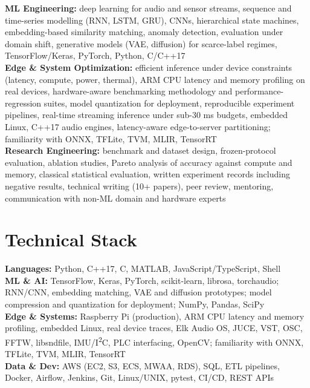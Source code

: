 \documentclass[11pt]{article}
\begin{document}
\textbf{ML Engineering:} deep learning for audio and sensor streams, sequence and time-series modelling (RNN, LSTM, GRU), CNNs, hierarchical state machines, embedding-based similarity matching, anomaly detection, evaluation under domain shift, generative models (VAE, diffusion) for scarce-label regimes, TensorFlow/Keras, PyTorch, Python, C/C++17\\
\textbf{Edge \& System Optimization:} efficient inference under device constraints (latency, compute, power, thermal), ARM CPU latency and memory profiling on real devices, hardware-aware benchmarking methodology and performance-regression suites, model quantization for deployment, reproducible experiment pipelines, real-time streaming inference under sub-30 ms budgets, embedded Linux, C++17 audio engines, latency-aware edge-to-server partitioning; familiarity with ONNX, TFLite, TVM, MLIR, TensorRT\\
\textbf{Research Engineering:} benchmark and dataset design, frozen-protocol evaluation, ablation studies, Pareto analysis of accuracy against compute and memory, classical statistical evaluation, written experiment records including negative results, technical writing (10+ papers), peer review, mentoring, communication with non-ML domain and hardware experts

\section*{Technical Stack}

\textbf{Languages:} Python, C++17, C, MATLAB, JavaScript/TypeScript, Shell\\
\textbf{ML \& AI:} TensorFlow, Keras, PyTorch, scikit-learn, librosa, torchaudio; RNN/CNN, embedding matching, VAE and diffusion prototypes; model compression and quantization for deployment; NumPy, Pandas, SciPy\\
\textbf{Edge \& Systems:} Raspberry Pi (production), ARM CPU latency and memory profiling, embedded Linux, real device traces, Elk Audio OS, JUCE, VST, OSC, FFTW, libsndfile, IMU/I\textsuperscript{2}C, PLC interfacing, OpenCV; familiarity with ONNX, TFLite, TVM, MLIR, TensorRT\\
\textbf{Data \& Dev:} AWS (EC2, S3, ECS, MWAA, RDS), SQL, ETL pipelines, Docker, Airflow, Jenkins, Git, Linux/UNIX, pytest, CI/CD, REST APIs

\end{document}
